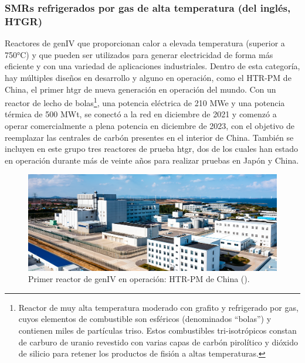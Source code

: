 \subsubsection{SMRs refrigerados por gas de alta temperatura (del inglés, HTGR)}

Reactores de \acrshort{genIV} que proporcionan calor a elevada temperatura (superior a 750°C) y que pueden ser utilizados para generar electricidad de forma más eficiente y con una variedad de aplicaciones industriales. Dentro de esta categoría, hay múltiples diseños en desarrollo y alguno en operación, como el HTR-PM de China, el primer \acrshort{htgr} de nueva generación en operación del mundo. Con un \gls{reactor de lecho de bolas}\footnote{Reactor de muy alta temperatura moderado con grafito y refrigerado por gas, cuyos elementos de combustible son esféricos (denominados ``bolas'') y contienen miles de partículas \acrshort{triso}. Estos combustibles tri-isotrópicos constan de carburo de uranio revestido con varias capas de carbón pirolítico y dióxido de silicio para retener los productos de fisión a altas temperaturas.}, una potencia eléctrica de 210 MWe y una potencia térmica de 500 MWt, se conectó a la red en diciembre de 2021 y comenzó a operar comercialmente a plena potencia en diciembre de 2023, con el objetivo de reemplazar las centrales de carbón presentes en el interior de China. También se incluyen en este grupo tres reactores de prueba \acrshort{htgr}, dos de los cuales han estado en operación durante más de veinte años para realizar pruebas en Japón y China.

\begin{figure}[h]
  \centering
  \includegraphics[width=\textwidth]{content/figures/HTR_PM_china.png}
  \caption{Primer reactor de \acrshort{genIV} en operación: HTR-PM de China (\cite{htr_pm_china}).}
  \label{fig:htr_pm_china}
\end{figure}

